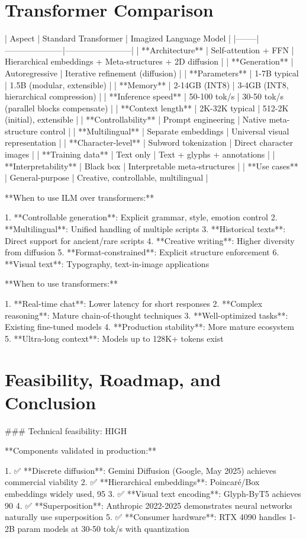 \documentclass[11pt]{article}
\begin{document}
\section{Transformer Comparison}

| Aspect | Standard Transformer | Imagized Language Model |
|--------|---------------------|------------------------|
| **Architecture** | Self-attention + FFN | Hierarchical embeddings + Meta-structures + 2D diffusion |
| **Generation** | Autoregressive | Iterative refinement (diffusion) |
| **Parameters** | 1-7B typical | 1.5B (modular, extensible) |
| **Memory** | 2-14GB (INT8) | 3-4GB (INT8, hierarchical compression) |
| **Inference speed** | 50-100 tok/s | 30-50 tok/s (parallel blocks compensate) |
| **Context length** | 2K-32K typical | 512-2K (initial), extensible |
| **Controllability** | Prompt engineering | Native meta-structure control |
| **Multilingual** | Separate embeddings | Universal visual representation |
| **Character-level** | Subword tokenization | Direct character images |
| **Training data** | Text only | Text + glyphs + annotations |
| **Interpretability** | Black box | Interpretable meta-structures |
| **Use cases** | General-purpose | Creative, controllable, multilingual |

**When to use ILM over transformers:**

1. **Controllable generation**: Explicit grammar, style, emotion control
2. **Multilingual**: Unified handling of multiple scripts
3. **Historical texts**: Direct support for ancient/rare scripts
4. **Creative writing**: Higher diversity from diffusion
5. **Format-constrained**: Explicit structure enforcement
6. **Visual text**: Typography, text-in-image applications

**When to use transformers:**

1. **Real-time chat**: Lower latency for short responses
2. **Complex reasoning**: Mature chain-of-thought techniques
3. **Well-optimized tasks**: Existing fine-tuned models
4. **Production stability**: More mature ecosystem
5. **Ultra-long context**: Models up to 128K+ tokens exist

\section{Feasibility, Roadmap, and Conclusion}

### Technical feasibility: HIGH

**Components validated in production:**

1. ✅ **Discrete diffusion**: Gemini Diffusion (Google, May 2025) achieves commercial viability
2. ✅ **Hierarchical embeddings**: Poincaré/Box embeddings widely used, 95%
3. ✅ **Visual text encoding**: Glyph-ByT5 achieves 90%
4. ✅ **Superposition**: Anthropic 2022-2025 demonstrates neural networks naturally use superposition
5. ✅ **Consumer hardware**: RTX 4090 handles 1-2B param models at 30-50 tok/s with quantization
\end{document}
